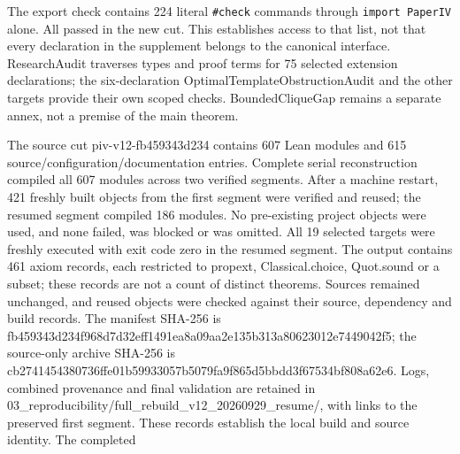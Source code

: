 \documentclass[english,11pt,a4paper]{article}
\newcounter{none}
\begin{document}
The export check contains 224 literal \nolinkurl{\#check} commands through \mbox{\texttt{import\ PaperIV}} alone. All passed in the new cut. This establishes access to that list, not that every declaration in the supplement belongs to the canonical interface. {\ttfamily\small ResearchAudi\discretionary{\hbox{\ensuremath{\hookrightarrow}}}{}{}t} traverses types and proof terms for 75 selected extension declarations; the six-declaration {\ttfamily\small OptimalTempl\discretionary{\hbox{\ensuremath{\hookrightarrow}}}{}{}ateObstructi\discretionary{\hbox{\ensuremath{\hookrightarrow}}}{}{}onAudit} and the other targets provide their own scoped checks. BoundedCliqueGap remains a separate annex, not a premise of the main theorem.

The source cut {\ttfamily\small piv-\discretionary{\hbox{\ensuremath{\hookrightarrow}}}{}{}v12-\discretionary{\hbox{\ensuremath{\hookrightarrow}}}{}{}fb459343d234} contains 607 Lean modules and 615 source/\allowbreak{}configuration/\allowbreak{}documentation entries. Complete serial reconstruction compiled all 607 modules across two verified segments. After a machine restart, 421 freshly built objects from the first segment were verified and reused; the resumed segment compiled 186 modules. No pre-existing project objects were used, and none failed, was blocked or was omitted. All 19 selected targets were freshly executed with exit code zero in the resumed segment. The output contains 461 axiom records, each restricted to {\ttfamily\small propext}, {\ttfamily\small Classical.\discretionary{\hbox{\ensuremath{\hookrightarrow}}}{}{}choice}, {\ttfamily\small Quot.\discretionary{\hbox{\ensuremath{\hookrightarrow}}}{}{}sound} or a subset; these records are not a count of distinct theorems. Sources remained unchanged, and reused objects were checked against their source, dependency and build records. The manifest SHA-256 is {\ttfamily\small fb459343d234\discretionary{\hbox{\ensuremath{\hookrightarrow}}}{}{}f968d7d32eff\discretionary{\hbox{\ensuremath{\hookrightarrow}}}{}{}1491ea8a09aa\discretionary{\hbox{\ensuremath{\hookrightarrow}}}{}{}2e135b313a80\discretionary{\hbox{\ensuremath{\hookrightarrow}}}{}{}623012e74490\discretionary{\hbox{\ensuremath{\hookrightarrow}}}{}{}42f5}; the source-only archive SHA-256 is {\ttfamily\small cb2741454380\discretionary{\hbox{\ensuremath{\hookrightarrow}}}{}{}736ffe01b599\discretionary{\hbox{\ensuremath{\hookrightarrow}}}{}{}33057b5079fa\discretionary{\hbox{\ensuremath{\hookrightarrow}}}{}{}9f865d5bbdd3\discretionary{\hbox{\ensuremath{\hookrightarrow}}}{}{}f67534bf808a\discretionary{\hbox{\ensuremath{\hookrightarrow}}}{}{}62e6}. Logs, combined provenance and final validation are retained in {\ttfamily\small 03\_\discretionary{\hbox{\ensuremath{\hookrightarrow}}}{}{}reproducibil\discretionary{\hbox{\ensuremath{\hookrightarrow}}}{}{}ity/\discretionary{\hbox{\ensuremath{\hookrightarrow}}}{}{}full\_\discretionary{\hbox{\ensuremath{\hookrightarrow}}}{}{}rebuild\_\discretionary{\hbox{\ensuremath{\hookrightarrow}}}{}{}v12\_\discretionary{\hbox{\ensuremath{\hookrightarrow}}}{}{}20260929\_\discretionary{\hbox{\ensuremath{\hookrightarrow}}}{}{}resume/}, with links to the preserved first segment. These records establish the local build and source identity. The completed 
\end{document}
